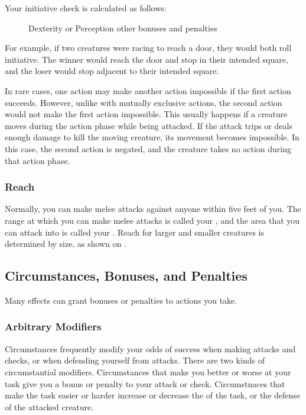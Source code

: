         Your initiative check is calculated as follows:

        \begin{figure}[h]
            \centering Dexterity or Perception \add other bonuses and penalties
        \end{figure}

        For example, if two creatures were racing to reach a door, they would both roll initiative.
        The winner would reach the door and stop in their intended square, and the loser would stop adjacent to their intended square.

         In rare cases, one action may make another action impossible if the first action succeeds.
        However, unlike with mutually exclusive actions, the second action would not make the first action impossible.
        This usually happens if a creature moves during the action phase while being attacked.
        If the attack trips or deals enough damage to kill the moving creature, its movement becomes impossible.
        In this case, the second action is negated, and the creature takes no action during that action phase.

        \subsubsection{Reach}\label{Reach}
            Normally, you can make melee attacks against anyone within five feet of you.
            The range at which you can make melee attacks is called your , and the area that you can attack into is called your .
            Reach for larger and smaller creatures is determined by size, as shown on .

    \subsection{Circumstances, Bonuses, and Penalties}

        Many effects can grant bonuses or penalties to actions you take.

        \subsubsection{Arbitrary Modifiers}

            Circumstances frequently modify your odds of success when making attacks and checks, or when defending yourself from attacks.
            There are two kinds of circumstantial modifiers.
            Circumstances that make you better or worse at your task give you a bonus or penalty to your attack or check.
            Circumstnaces that make the task easier or harder increase or decrease the  of the task, or the defense of the attacked creature.

